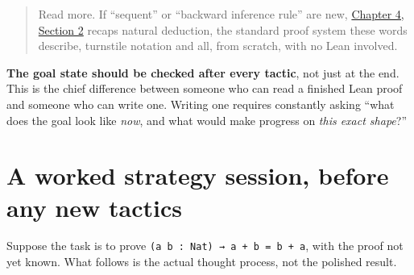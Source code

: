 \begin{quote}
Read more. If ``sequent'' or ``backward inference rule'' are new, \hyperref[sec:04-propositions-and-proofs:02-logic-recap:1]{Chapter 4, Section 2} recaps natural deduction, the standard proof system these words describe, turnstile notation and all, from scratch, with no Lean involved.
\end{quote}

\textbf{The goal state should be checked after every tactic}, not just at the end. This is the chief difference between someone who can read a finished Lean proof and someone who can write one. Writing one requires constantly asking ``what does the goal look like \emph{now}, and what would make progress on \emph{this exact shape}?''

\section{A worked strategy session, before any new tactics}\label{sec:05-tactics:01-goal-state:2}

Suppose the task is to prove \texttt{(a b : Nat) → a + b = b + a}, with the proof not yet known. What follows is the actual thought process, not the polished result.

